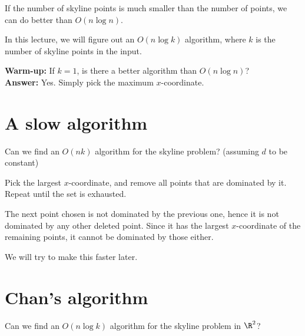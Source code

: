 
If the number of skyline points is much smaller than the number of points,
we can do better than $O(n \log n)$.

In this lecture, we will figure out an $O(n \log k)$ algorithm,
where $k$ is the number of skyline points in the input.

\textbf{Warm-up:} If $k = 1$, is there a better algorithm than $O(n \log n)$? \\
\textbf{Answer:} Yes. Simply pick the maximum $x$-coordinate.

\section{A slow algorithm} \label{sec:slow}
\begin{question*}
    Can we find an $O(n k)$ algorithm for the skyline problem?
    (assuming $d$ to be constant)
\end{question*}
\begin{solution}
    Pick the largest $x$-coordinate,
    and remove all points that are dominated by it.
    Repeat until the set is exhausted.

    The next point chosen is not dominated by the previous one,
    hence it is not dominated by any other deleted point.
    Since it has the largest $x$-coordinate of the remaining points,
    it cannot be dominated by those either.
\end{solution}
We will try to make this faster later.

\section{Chan's algorithm} \label{sec:chan}
\begin{question*}
    Can we find an $O(n \log k)$ algorithm for the skyline problem in
    $\R^2$?
\end{question*}

